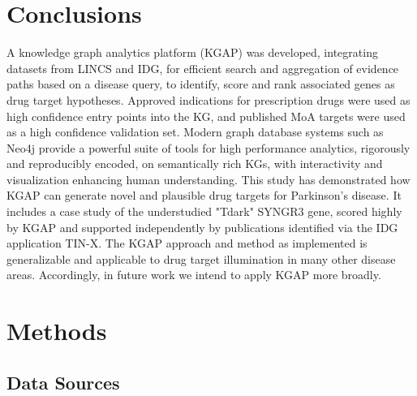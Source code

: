 \section{Conclusions}

A knowledge graph analytics platform (KGAP) was developed, integrating datasets from LINCS and IDG, for efficient search and aggregation of evidence paths based on a disease query, to identify, score and rank associated genes as drug target hypotheses. Approved indications for prescription drugs were used as high confidence entry points into the KG, and published MoA targets were used as a high confidence validation set. Modern graph database systems such as Neo4j provide a powerful suite of tools for high performance analytics, rigorously and reproducibly encoded, on semantically rich KGs, with interactivity and visualization enhancing human understanding. This study has demonstrated how KGAP can generate novel and plausible drug targets for Parkinson's disease. It includes a case study of the understudied "Tdark" SYNGR3 gene, scored highly by KGAP and supported independently by publications identified via the IDG application TIN-X. The KGAP approach and method as implemented is generalizable and applicable to drug target illumination in many other disease areas. Accordingly, in future work we intend to apply KGAP more broadly. 

\section{Methods}

\subsection{Data Sources}

